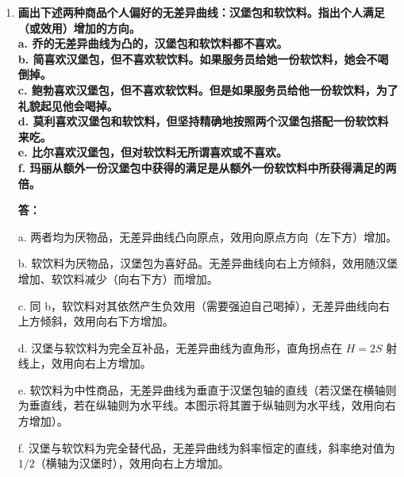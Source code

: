 \begin{enumerate}[label=\textbf{\arabic*.}, leftmargin=*]
\begin{center}
			\end{center}
		
			\item \textbf{画出下述两种商品个人偏好的无差异曲线：汉堡包和软饮料。指出个人满足（或效用）增加的方向。\\ a. 乔的无差异曲线为凸的，汉堡包和软饮料都不喜欢。\\ b. 简喜欢汉堡包，但不喜欢软饮料。如果服务员给她一份软饮料，她会不喝倒掉。\\ c. 鲍勃喜欢汉堡包，但不喜欢软饮料。但是如果服务员给他一份软饮料，为了礼貌起见他会喝掉。\\ d. 莫利喜欢汉堡包和软饮料，但坚持精确地按照两个汉堡包搭配一份软饮料来吃。\\ e. 比尔喜欢汉堡包，但对软饮料无所谓喜欢或不喜欢。\\ f. 玛丽从额外一份汉堡包中获得的满足是从额外一份软饮料中所获得满足的两倍。}
			
			\textbf{答：}
			
			a. 两者均为厌物品，无差异曲线凸向原点，效用向原点方向（左下方）增加。
			
			b. 软饮料为厌物品，汉堡包为喜好品。无差异曲线向右上方倾斜，效用随汉堡增加、软饮料减少（向右下方）而增加。
			
			c. 同 b，软饮料对其依然产生负效用（需要强迫自己喝掉），无差异曲线向右上方倾斜，效用向右下方增加。
			
			d. 汉堡与软饮料为完全互补品，无差异曲线为直角形，直角拐点在 $H = 2S$ 射线上，效用向右上方增加。
			
			e. 软饮料为中性商品，无差异曲线为垂直于汉堡包轴的直线（若汉堡在横轴则为垂直线，若在纵轴则为水平线。本图示将其置于纵轴则为水平线，效用向右方增加）。
			
			f. 汉堡与软饮料为完全替代品，无差异曲线为斜率恒定的直线，斜率绝对值为 $1/2$（横轴为汉堡时），效用向右上方增加。
			

\end{enumerate}
